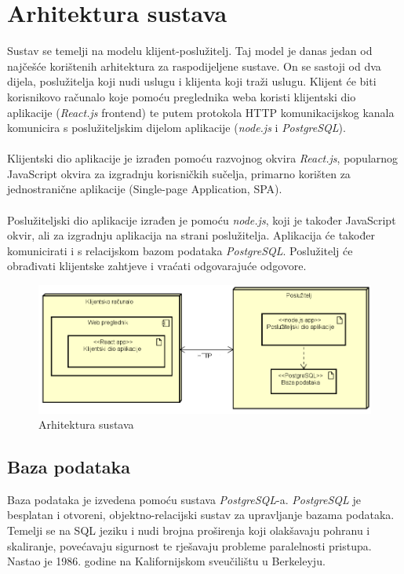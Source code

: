 \documentclass[zavrsnirad]{fer}
\begin{document}
\newpage
\chapter{Arhitektura sustava}

Sustav se temelji na modelu klijent-poslužitelj. Taj model je danas jedan od najčešće korištenih arhitektura za raspodijeljene sustave. On se sastoji od dva dijela, poslužitelja koji nudi uslugu i klijenta koji traži uslugu. Klijent će biti korisnikovo računalo koje pomoću preglednika weba koristi klijentski dio aplikacije (\textit{React.js} frontend) te putem protokola HTTP komunikacijskog kanala komunicira s poslužiteljskim dijelom aplikacije (\textit{node.js} i \textit{PostgreSQL}).\\\\
Klijentski dio aplikacije je izrađen pomoću razvojnog okvira \textit{React.js}, popularnog JavaScript okvira za izgradnju korisničkih sučelja, primarno korišten za jednostranične aplikacije (Single-page Application, SPA).\\\\
Poslužiteljski dio aplikacije izrađen je pomoću \textit{node.js}, koji je također JavaScript okvir, ali za izgradnju aplikacija na strani poslužitelja. Aplikacija će također komunicirati i s relacijskom bazom podataka \textit{PostgreSQL}. Poslužitelj će obrađivati klijentske zahtjeve i vraćati odgovarajuće odgovore.\\

\begin{figure}[htb]
	\centering
	\includegraphics[width=0.8\linewidth]{Figures/arhitektura.png} 
	\caption{Arhitektura sustava}
	\label{slk:sustav}
\end{figure}
\newpage
\section{Baza podataka}
\label{sec:baza}
Baza podataka je izvedena pomoću sustava \textit{PostgreSQL}-a. \textit{PostgreSQL} je besplatan i otvoreni, objektno-relacijski sustav za upravljanje bazama podataka. Temelji se na SQL jeziku i nudi brojna proširenja koji olakšavaju pohranu i skaliranje, povećavaju sigurnost te rješavaju probleme paralelnosti pristupa. Nastao je 1986. godine na Kalifornijskom sveučilištu u Berkeleyju. \cite{postgresql}\\
\end{document}
